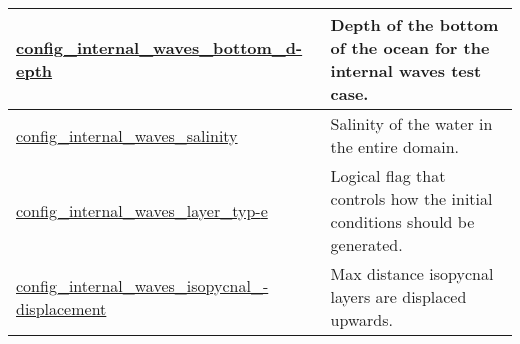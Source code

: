 {\begin{center}
\begin{longtable}{| p{2.0in} || p{4.0in} |}
    \hline
    \hyperref[subsec:nm_sec_config_internal_waves_bottom_depth]{config\_internal\_waves\_bottom\_d-}\hyperref[subsec:nm_sec_config_internal_waves_bottom_depth]{epth}& Depth of the bottom of the ocean for the internal waves test case. \\
    \hline
    \hyperref[subsec:nm_sec_config_internal_waves_salinity]{config\_internal\_waves\_salinity} & Salinity of the water in the entire domain. \\
    \hline
    \hyperref[subsec:nm_sec_config_internal_waves_layer_type]{config\_internal\_waves\_layer\_typ-}\hyperref[subsec:nm_sec_config_internal_waves_layer_type]{e}& Logical flag that controls how the initial conditions should be generated. \\
    \hline
    \hyperref[subsec:nm_sec_config_internal_waves_isopycnal_displacement]{config\_internal\_waves\_isopycnal\_-}\hyperref[subsec:nm_sec_config_internal_waves_isopycnal_displacement]{displacement}& Max distance isopycnal layers are displaced upwards. \\
    \hline
\end{longtable}
\end{center}
}
